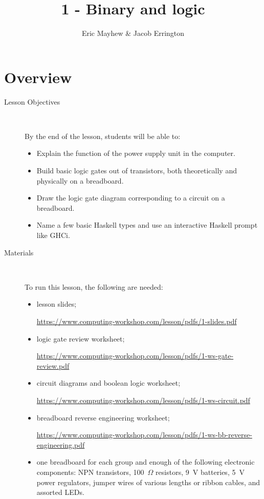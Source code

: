 \documentclass[11pt]{article}
\title{1 - Binary and logic}
\author{Eric Mayhew \& Jacob Errington}
\date{}
\newcommand{\cwurl}{https://www.computing-workshop.com/lesson/pdfs/}
\begin{document}
\maketitle

\section*{Overview}

\begin{description}
  \item[Lesson Objectives] ~

   By the end of the lesson, students will be able to:

  \begin{itemize}
    \item Explain the function of the power supply unit in the computer.

    \item Build basic logic gates out of transistors, both theoretically and
      physically on a breadboard.

    \item Draw the logic gate diagram corresponding to a circuit on a
      breadboard.

    \item Name a few basic Haskell types and use an interactive Haskell prompt
      like GHCi.
  \end{itemize}

  \item [Materials]~

    To run this lesson, the following are needed:

    \begin{itemize}
      \item
        lesson slides;

        \url{\cwurl 1-slides.pdf}

      \item
        logic gate review worksheet;

        \url{\cwurl 1-ws-gate-review.pdf}

      \item
        circuit diagrams and boolean logic worksheet;

        \url{\cwurl 1-ws-circuit.pdf}

      \item
        breadboard reverse engineering worksheet;

        \url{\cwurl 1-ws-bb-reverse-engineering.pdf}

      \item
        one breadboard for each group and enough of the following electronic
        components:
        NPN transistors,
        100~$\Omega$ resistors,
        9~V batteries,
        5~V power regulators,
        jumper wires of various lengths or ribbon cables,
        and assorted LEDs.

    \end{itemize}
\end{description}
\end{document}
